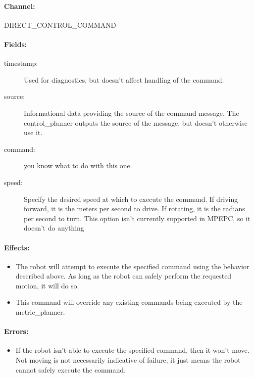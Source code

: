 \documentclass{article}
\begin{document}
\paragraph{Channel:}

DIRECT\_CONTROL\_COMMAND

\paragraph{Fields:}

\begin{description}
 \item[timestamp:] Used for diagnostics, but doesn't affect handling of the command.
 \item[source:] Informational data providing the source of the command message. The control\_planner outputs the 
source of the message, but doesn't otherwise use it.
  \item[command:] you know what to do with this one.
  \item[speed:] Specify the desired speed at which to execute the command. If driving forward, it is the meters per 
second to drive. If rotating, it is the radians per second to turn. This option isn't currently supported in MPEPC, so 
it doesn't do anything
\end{description}

\paragraph{Effects:}

\begin{itemize}
  \item The robot will attempt to execute the specified command using the behavior described above. As long as the 
robot can safely perform the requested motion, it will do so.
  \item This command will override any existing commands being executed by the metric\_planner.
\end{itemize}

\paragraph{Errors:}

\begin{itemize}
 \item If the robot isn't able to execute the specified command, then it won't move. Not moving is not necessarily 
indicative of failure, it just means the robot cannot safely execute the command.
\end{itemize}
\end{document}
